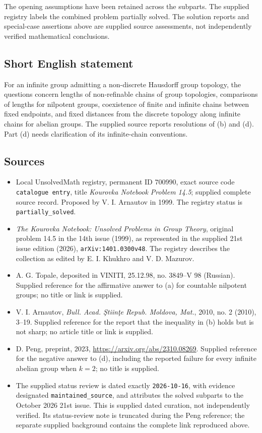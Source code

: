\documentclass[11pt]{article}
\begin{document}
The opening assumptions have been retained across the subparts. The supplied registry labels the combined problem partially solved. The solution reports and special-case assertions above are supplied source assessments, not independently verified mathematical conclusions.
\subsection{Short English statement}
For an infinite group admitting a non-discrete Hausdorff group topology, the questions concern lengths of non-refinable chains of group topologies, comparisons of lengths for nilpotent groups, coexistence of finite and infinite chains between fixed endpoints, and fixed distances from the discrete topology along infinite chains for abelian groups. The supplied source reports resolutions of (b) and (d). Part (d) needs clarification of its infinite-chain conventions.
\subsection{Sources}
\begin{itemize}
\item Local UnsolvedMath registry, permanent ID \(700990\), exact source code \texttt{catalogue entry}, title \emph{Kourovka Notebook Problem 14.5}; supplied complete source record. Proposed by V. I. Arnautov in 1999. The registry status is \texttt{partially\_solved}.
\item \emph{The Kourovka Notebook: Unsolved Problems in Group Theory}, original problem 14.5 in the 14th issue (1999), as represented in the supplied 21st issue edition (2026), \texttt{arXiv:1401.0300v48}. The registry describes the collection as edited by E. I. Khukhro and V. D. Mazurov.
\item A. G. Topale, deposited in VINITI, 25.12.98, no. 3849--V 98 (Russian). Supplied reference for the affirmative answer to (a) for countable nilpotent groups; no title or link is supplied.
\item V. I. Arnautov, \emph{Bull. Acad. \c{S}tiin\c{t}e Repub. Moldova, Mat.}, 2010, no. 2 (2010), 3--19. Supplied reference for the report that the inequality in (b) holds but is not sharp; no article title or link is supplied.
\item D. Peng, preprint, 2023, \url{https://arxiv.org/abs/2310.08269}. Supplied reference for the negative answer to (d), including the reported failure for every infinite abelian group when \(k=2\); no title is supplied.
\item The supplied status review is dated exactly \texttt{2026-10-16}, with evidence designated \texttt{maintained\_source}, and attributes the solved subparts to the October 2026 21st issue. This is supplied dated curation, not independently verified. Its status-review note is truncated during the Peng reference; the separate supplied background contains the complete link reproduced above.
\end{itemize}
\end{document}
